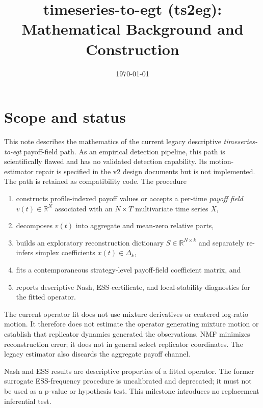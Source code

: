 \documentclass[11pt]{article}
\title{\textbf{timeseries-to-egt (ts2eg):\\
Mathematical Background and Construction}}
\author{}
\date{\today}
\newcommand{\R}{\mathbb{R}}
\begin{document}
\maketitle

\section{Scope and status}
This note describes the mathematics of the current legacy descriptive
\emph{timeseries-to-egt} payoff-field path. As an empirical detection pipeline,
this path is scientifically flawed and has no validated detection capability.
Its motion-estimator repair is specified in the v2 design documents but is not
implemented. The path is retained as compatibility code. The procedure
\begin{enumerate}[leftmargin=*]
    \item constructs profile-indexed payoff values or accepts a per-time \emph{payoff field} $v(t)\in\R^N$ associated with an $N\times T$ multivariate time series $X$,
    \item decomposes $v(t)$ into aggregate and mean-zero relative parts,
    \item builds an exploratory reconstruction dictionary $S\in\R^{N\times k}$ and separately re-infers simplex coefficients $x(t)\in\Delta_k$,
    \item fits a contemporaneous strategy-level payoff-field coefficient matrix, and
    \item reports descriptive Nash, ESS-certificate, and local-stability diagnostics for the fitted operator.
\end{enumerate}
The current operator fit does not use mixture derivatives or centered log-ratio
motion. It therefore does not estimate the operator generating mixture motion or
establish that replicator dynamics generated the observations. NMF minimizes
reconstruction error; it does not in general select replicator coordinates. The
legacy estimator also discards the aggregate payoff channel.

Nash and ESS results are descriptive properties of a fitted operator. The former
surrogate ESS-frequency procedure is uncalibrated and deprecated; it must not be
used as a p-value or hypothesis test. This milestone introduces no replacement
inferential test.
\end{document}
